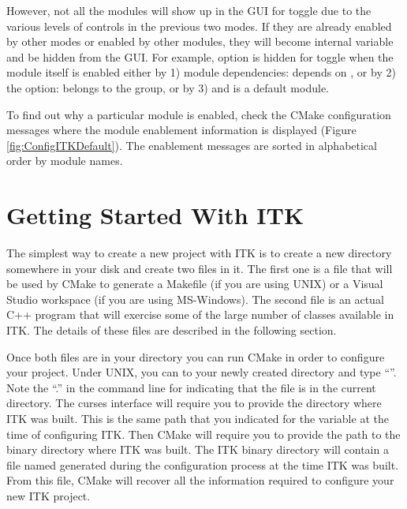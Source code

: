 However, not all the modules will show up in the GUI for toggle due to the
various levels of controls in the previous two modes.  If they are already
enabled by other modes or enabled by other modules, they will become internal
variable and be hidden from the GUI. For example,  
option is hidden for toggle when the module  itself is enabled either  by
1) module dependencies:  depends on ,   or by 2) the
 option:  belongs to the group,  or by 3)
 and  is a default module.

To find out why a particular module is enabled, check the CMake configuration
messages where the module enablement information is displayed (Figure
\ref{fig:ConfigITKDefault}). The enablement messages are sorted in alphabetical
order by module names.

\section{Getting Started With ITK }
\label{sec:GettingStartedWithITK}

The simplest way to create a new project with ITK is to create a new directory
somewhere in your disk and create two files in it. The first one is a
 file that will be used by CMake to generate a Makefile
(if you are using UNIX) or a Visual Studio workspace (if you are using
MS-Windows).  The second file is an actual C++ program that will exercise
some of the large number of classes available in ITK. The details of these files
are described in the following section.

Once both files are in your directory you can run CMake in order to configure
your project. Under UNIX, you can  to your newly created directory
and type ``''. Note the ``.'' in the command line for
indicating that the  file is in the current directory.
The curses interface will require you to provide the directory where ITK was
built. This is the same path that you indicated for the
 variable at the time of configuring ITK. Then CMake
will require you to provide the path to the binary directory where ITK was
built. The ITK binary directory will contain a file named
 generated during the configuration process at the time
ITK was built.  From this file, CMake will recover all the information
required to configure your new ITK project.


